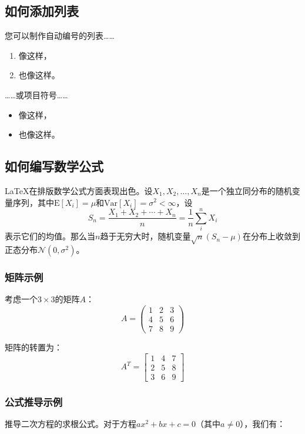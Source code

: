 \documentclass{article}
\begin{document}
\subsection{如何添加列表}

您可以制作自动编号的列表……

\begin{enumerate}
      \item 像这样，
      \item 也像这样。
\end{enumerate}
……或项目符号……
\begin{itemize}
      \item 像这样，
      \item 也像这样。
\end{itemize}

\subsection{如何编写数学公式}

\LaTeX{}在排版数学公式方面表现出色。设$X_1, X_2, \ldots, X_n$是一个独立同分布的随机变量序列，其中$\text{E}[X_i] = \mu$和$\text{Var}[X_i] = \sigma^2 < \infty$，设
\[S_n = \frac{X_1 + X_2 + \cdots + X_n}{n}
      = \frac{1}{n}\sum_{i}^{n} X_i\]
表示它们的均值。那么当$n$趋于无穷大时，随机变量$\sqrt{n}(S_n - \mu)$在分布上收敛到正态分布$\mathcal{N}(0, \sigma^2)$。

\subsubsection{矩阵示例}

考虑一个$3 \times 3$的矩阵$A$：
\[A = \begin{pmatrix}
            1 & 2 & 3 \\
            4 & 5 & 6 \\
            7 & 8 & 9
      \end{pmatrix}\]

矩阵的转置为：
\[A^T = \begin{bmatrix}
            1 & 4 & 7 \\
            2 & 5 & 8 \\
            3 & 6 & 9
      \end{bmatrix}\]

\subsubsection{公式推导示例}

推导二次方程的求根公式。对于方程$ax^2 + bx + c = 0$（其中$a \neq 0$），我们有：
\end{document}
